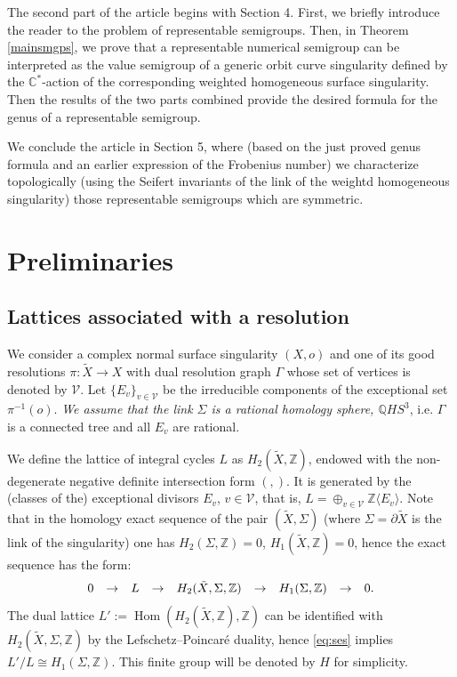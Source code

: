 \documentclass[12pt,a4paper]{amsart}
\DeclareMathOperator{\Hom}{Hom}
\def\V{{\mathcal V}}
\def\ZZ{\mathbb{Z}}
\theoremstyle{remark}
\theoremstyle{definition}
\begin{document}
The second part of the article begins with Section 4.
First, we briefly introduce the reader to the problem of representable semigroups. Then, in Theorem \ref{mainsmgps}, we prove that a representable numerical semigroup can be interpreted as the value semigroup of a  generic orbit curve singularity defined by the $\mathbb{C}^*$-action of the corresponding weighted homogeneous surface singularity. 
Then the results of the two parts combined provide the 
desired formula for the genus of a representable semigroup. 

We conclude the article in Section 5, where (based on the just proved genus formula and an  earlier 
expression of the Frobenius number)  we characterize topologically 
(using the Seifert invariants of the link of the weightd homogeneous singularity) 
those representable semigroups which are symmetric. 




\section{Preliminaries}\label{s:prel}

\subsection{Lattices associated with a resolution}
\label{sec:lattice}
We consider a complex normal surface singularity $(X,o)$ and one of its good resolutions $\pi:\tilde X\to X$ with dual resolution graph $\Gamma$ whose set of vertices is denoted by $\V$. Let $\{E_v\}_{v\in \V}$ be the irreducible components
of the exceptional set $\pi^{-1}(o)$. {\it We assume that the link $\Sigma$ is a 
rational homology sphere, $\mathbb{Q}HS^3$}, i.e.
$\Gamma$ is a connected tree and all $E_v$ are rational. 


We define the lattice of integral cycles $L$ as  $H_2(\tilde X,\ZZ)$, endowed with the non-degenerate negative definite intersection form $(,)$. It is generated by the (classes of the) exceptional divisors $E_v$, $v\in \V$, that is, $L=\oplus_{v\in \V} \ZZ\langle E_v \rangle$. Note that in the homology exact sequence of the pair $(\tilde X, \Sigma)$ (where $\Sigma=\partial \tilde X$ is the link of the singularity) one has
$H_2(\Sigma,\ZZ)=0$, $H_1(\tilde X, \ZZ)=0$,  hence the exact sequence  has the form:
\begin{equation}
\label{eq:ses}
\array{ccccccccc}
0 & \to & L & \to & H_2(\tilde X,\Sigma,\ZZ) & \to & H_1(\Sigma,\ZZ) & \to & 0.\\
\endarray
\end{equation}
The dual lattice  $L':= \Hom(H_2(\tilde X,\ZZ),\ZZ)$ can be identified with $H_2(\tilde{X}, \Sigma, \ZZ)$ by the Lefschetz--Poincar\'e duality, hence \eqref{eq:ses} implies 
$L'/L\cong H_1(\Sigma,\ZZ)$. This finite group will be denoted by $H$ for simplicity. 
\end{document}
